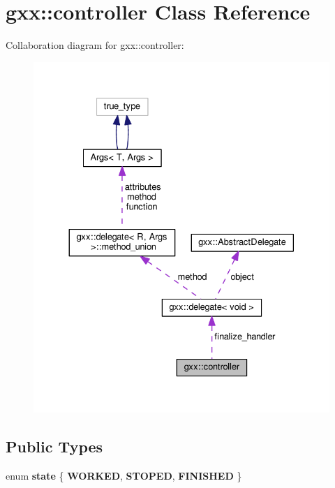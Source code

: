 \hypertarget{classgxx_1_1controller}{}\section{gxx\+:\+:controller Class Reference}
\label{classgxx_1_1controller}


Collaboration diagram for gxx\+:\+:controller\+:
\nopagebreak
\begin{figure}[H]
\begin{center}
\leavevmode
\includegraphics[width=330pt]{classgxx_1_1controller__coll__graph}
\end{center}
\end{figure}
\subsection*{Public Types}
\begin{DoxyCompactItemize}
\item 
enum {\bfseries state} \{ {\bfseries W\+O\+R\+K\+ED}, 
{\bfseries S\+T\+O\+P\+ED}, 
{\bfseries F\+I\+N\+I\+S\+H\+ED}
 \}\hypertarget{classgxx_1_1controller_ac07045ccbd72c2b4de4636962487c876}{}\label{classgxx_1_1controller_ac07045ccbd72c2b4de4636962487c876}

\end{DoxyCompactItemize}
